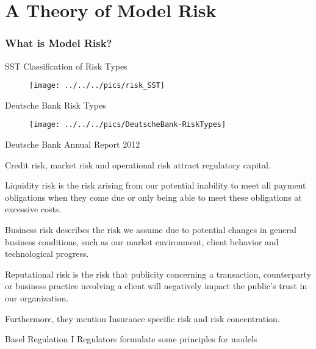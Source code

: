 
\part{A Theory of Model Risk}

\section{What is Model Risk?}

{SST Classification of Risk Types}
\begin{figure}
	\centering
		\texttt{[image: ../../../pics/risk\_SST]}
	\label{fig:Risk_map1}
\end{figure}

{Deutsche Bank Risk Types}
\begin{figure}
	\centering
		\texttt{[image: ../../../pics/DeutscheBank-RiskTypes]}
	\label{fig:Risk_map2}
\end{figure}

{Deutsche Bank Annual Report 2012}






Credit risk, market risk and operational risk attract regulatory capital.

	Liquidity risk is the risk arising from our potential inability to meet all payment obligations when they come due or only being able to meet these obligations at excessive costs.

	Business risk describes the risk we assume due to potential changes in general business conditions, such as our market environment, client behavior and technological progress.

	Reputational risk is the risk that publicity concerning a transaction, counterparty or business practice involving a client will negatively impact the public's trust in our organization.

	Furthermore, they mention Insurance specific risk and risk concentration.






{Basel Regulation I}
Regulators formulate some principles for models






